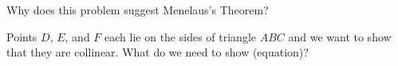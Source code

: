 




Why does this problem suggest Menelaus's Theorem?











Points $D$, $E$, and $F$ each lie on the sides of triangle $ABC$ and we want to show that they are collinear. What do we need to show (equation)?




